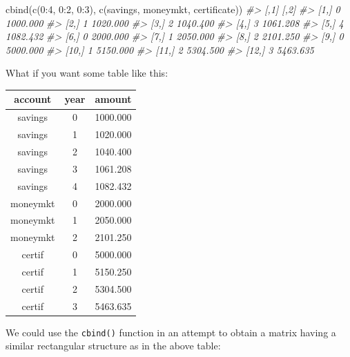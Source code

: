 \documentclass[
]{book}
\newenvironment{Shaded}{\begin{snugshade}}{\end{snugshade}}
\newcommand{\CommentTok}[1]{\textcolor[rgb]{0.56,0.35,0.01}{\textit{#1}}}
\newcommand{\DecValTok}[1]{\textcolor[rgb]{0.00,0.00,0.81}{#1}}
\newcommand{\FunctionTok}[1]{\textcolor[rgb]{0.00,0.00,0.00}{#1}}
\newcommand{\NormalTok}[1]{#1}
\newcommand{\SpecialCharTok}[1]{\textcolor[rgb]{0.00,0.00,0.00}{#1}}
\begin{document}
\begin{Shaded}
\begin{Highlighting}[]
\FunctionTok{cbind}\NormalTok{(}\FunctionTok{c}\NormalTok{(}\DecValTok{0}\SpecialCharTok{:}\DecValTok{4}\NormalTok{, }\DecValTok{0}\SpecialCharTok{:}\DecValTok{2}\NormalTok{, }\DecValTok{0}\SpecialCharTok{:}\DecValTok{3}\NormalTok{), }\FunctionTok{c}\NormalTok{(savings, moneymkt, certificate))}
\CommentTok{\#\textgreater{}       [,1]     [,2]}
\CommentTok{\#\textgreater{}  [1,]    0 1000.000}
\CommentTok{\#\textgreater{}  [2,]    1 1020.000}
\CommentTok{\#\textgreater{}  [3,]    2 1040.400}
\CommentTok{\#\textgreater{}  [4,]    3 1061.208}
\CommentTok{\#\textgreater{}  [5,]    4 1082.432}
\CommentTok{\#\textgreater{}  [6,]    0 2000.000}
\CommentTok{\#\textgreater{}  [7,]    1 2050.000}
\CommentTok{\#\textgreater{}  [8,]    2 2101.250}
\CommentTok{\#\textgreater{}  [9,]    0 5000.000}
\CommentTok{\#\textgreater{} [10,]    1 5150.000}
\CommentTok{\#\textgreater{} [11,]    2 5304.500}
\CommentTok{\#\textgreater{} [12,]    3 5463.635}
\end{Highlighting}
\end{Shaded}

What if you want some table like this:

\begin{longtable}[]{@{}ccc@{}}
\toprule
account & year & amount \\
\midrule
\endhead
savings & 0 & 1000.000 \\
savings & 1 & 1020.000 \\
savings & 2 & 1040.400 \\
savings & 3 & 1061.208 \\
savings & 4 & 1082.432 \\
moneymkt & 0 & 2000.000 \\
moneymkt & 1 & 2050.000 \\
moneymkt & 2 & 2101.250 \\
certif & 0 & 5000.000 \\
certif & 1 & 5150.250 \\
certif & 2 & 5304.500 \\
certif & 3 & 5463.635 \\
\bottomrule
\end{longtable}

We could use the \texttt{cbind()} function in an attempt to obtain a matrix having
a similar rectangular structure as in the above table:
\end{document}
